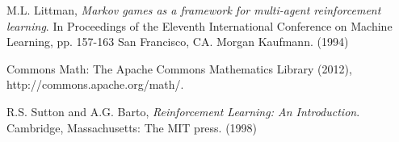 \newpage
\nocite{*}


\begin{thebibliography}{9}

  M.L. Littman,
  \emph{Markov games as a framework for multi-agent reinforcement learning}. In Proceedings of the Eleventh International Conference on Machine Learning, pp. 157-163 San Francisco, CA. Morgan Kaufmann. (1994)
 
Commons Math: The Apache Commons Mathematics Library (2012),\\ http://commons.apache.org/math/. 

R.S. Sutton and A.G. Barto,
\emph{Reinforcement Learning: An Introduction}. 
Cambridge, Massachusetts: The MIT press. (1998) 
\end{thebibliography}
